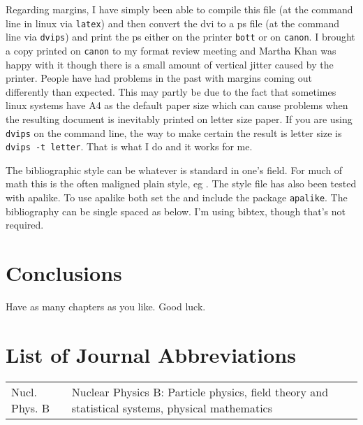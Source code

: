 \documentclass[11pt]{report}
\begin{document}
Regarding margins, I have simply been able to compile this file (at
the command line in linux via \texttt{latex}) and then convert the dvi
to a ps file (at the command line via \texttt{dvips}) and print the ps
either on the printer \texttt{bott} or on \texttt{canon}.  I brought
a copy printed on \texttt{canon} to my format review meeting and
Martha Khan was happy with it though there is a small amount of
vertical jitter caused by the printer.  People have had problems in
the past with margins coming out differently than expected.  This may
partly be due to the fact that sometimes linux systems have A4 as the
default paper size which can cause problems when the resulting
document is inevitably printed on letter size paper.  If you are using
\texttt{dvips} on the command line, the way to make certain the result
is letter size is \texttt{dvips -t letter}.  That is what I do and it
works for me.

The bibliographic style can be whatever is standard in one's field.
For much of math this is the often maligned plain style, eg
\cite{bkerfc}.
 The style file has also been tested with apalike.  To
use apalike both set the \verb++ and
include the package \texttt{apalike}.   The bibliography can be single
spaced as below.  I'm using bibtex, though that's not required.

\chapter{Conclusions}
Have as many chapters as you like.  Good luck.





\chapter*{List of Journal Abbreviations}
\begin{center}
\begin{tabular}{lp{}}
  Nucl. Phys. B \dotfill & Nuclear Physics B: Particle physics, field
  theory and statistical systems, physical mathematics \\
\end{tabular}
\end{center}
\end{document}
